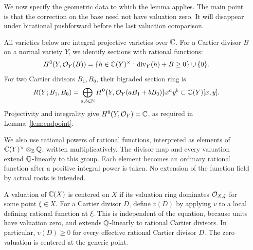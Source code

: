 We now specify the geometric data to which the lemma applies. The main
point is that the correction on the base need not have valuation zero.
It will disappear under birational pushforward before the last
valuation comparison.

All varieties below are integral projective varieties over \(\mathbb C\).
For a Cartier divisor \(B\) on a normal variety \(Y\), we identify
sections with rational functions:
\[
H^0(Y,\mathcal O_Y(B))
=\{h\in\mathbb C(Y)^\times:\operatorname{div}_Y(h)+B\geq0\}\cup\{0\}.
\]
For two Cartier divisors \(B_1,B_0\), their bigraded section ring is
\begin{equation}
\label{eq:section-ring}
R(Y;B_1,B_0)
=\bigoplus_{a,b\in\mathbb N}
H^0\bigl(Y,\mathcal O_Y(aB_1+bB_0)\bigr)x^ay^b
\subset\mathbb C(Y)[x,y].
\end{equation}
Projectivity and integrality give \(H^0(Y,\mathcal O_Y)=\mathbb C\), as required
in Lemma~\ref{lem:endpoint}.

We also use rational powers of rational functions, interpreted as
elements of
\(\mathbb C(Y)^\times\otimes_{\mathbb Z}\mathbb Q\), written multiplicatively.
The divisor map and every valuation extend \(\mathbb Q\)-linearly to this
group. Each element becomes an ordinary rational function after a
positive integral power is taken. No extension of the function field
by actual roots is intended.

A valuation of \(\mathbb C(X)\) is centered on \(X\) if its valuation ring
dominates \(\mathcal O_{X,\xi}\) for some point \(\xi\in X\). For a Cartier
divisor \(D\), define \(v(D)\) by applying \(v\) to a local defining
rational function at \(\xi\). This is independent of the equation,
because units have valuation zero, and extends \(\mathbb Q\)-linearly to
rational Cartier divisors. In particular, \(v(D)\geq0\) for every
effective rational Cartier divisor \(D\). The zero valuation is
centered at the generic point.


